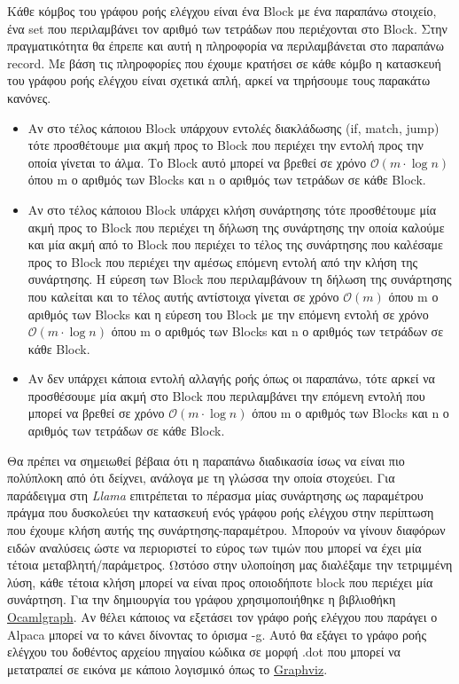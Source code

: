 \documentclass[12pt]{article}
\newcommand{\Llama}{\textit{Llama }}
\begin{document}
Κάθε κόμβος του γράφου ροής ελέγχου είναι ένα Block με ένα παραπάνω στοιχείο, ένα set που περιλαμβάνει τον αριθμό των τετράδων που περιέχονται στο Block. Στην πραγματικότητα θα έπρεπε και αυτή η πληροφορία να περιλαμβάνεται στο παραπάνω record. Με βάση τις πληροφορίες που έχουμε κρατήσει σε κάθε κόμβο η κατασκευή του γράφου ροής ελέγχου είναι σχετικά απλή, αρκεί να τηρήσουμε τους παρακάτω κανόνες.
\begin{itemize}
\item Αν στο τέλος κάποιου Block υπάρχουν εντολές διακλάδωσης (if, match, jump) τότε προσθέτουμε μια ακμή προς το Block που περιέχει την εντολή προς την οποία γίνεται το άλμα. Το Block αυτό μπορεί να βρεθεί σε χρόνο $\mathcal{O}(m \cdot \log n)$ όπου m ο αριθμός των Blocks και n ο αριθμός των τετράδων σε κάθε Block.
\item Αν στο τέλος κάποιου Block υπάρχει κλήση συνάρτησης τότε προσθέτουμε μία ακμή προς το Block που περιέχει τη δήλωση της συνάρτησης την οποία καλούμε και μία ακμή από το Block που περιέχει το τέλος της συνάρτησης που καλέσαμε προς το Block που περιέχει την αμέσως επόμενη εντολή από την κλήση της συνάρτησης. Η εύρεση των Block που περιλαμβάνουν τη δήλωση της συνάρτησης που καλείται και το τέλος αυτής αντίστοιχα γίνεται σε χρόνο $\mathcal{O}(m)$ όπου m ο αριθμός των Blocks και η εύρεση του Block με την επόμενη εντολή σε χρόνο $\mathcal{O}(m \cdot \log n)$ όπου m ο αριθμός των Blocks και n ο αριθμός των τετράδων σε κάθε Block.
\item Αν δεν υπάρχει κάποια εντολή αλλαγής ροής όπως οι παραπάνω, τότε αρκεί να προσθέσουμε μία ακμή στο Block που περιλαμβάνει την επόμενη εντολή που μπορεί να βρεθεί σε χρόνο $\mathcal{O}(m \cdot \log n)$ όπου m ο αριθμός των Blocks και n ο αριθμός των τετράδων σε κάθε Block.
\end{itemize}
Θα πρέπει να σημειωθεί βέβαια ότι η παραπάνω διαδικασία ίσως να είναι πιο πολύπλοκη από ότι δείχνει, ανάλογα με τη γλώσσα την οποία στοχεύει. Για παράδειγμα στη \Llama επιτρέπεται το πέρασμα μίας συνάρτησης ως παραμέτρου πράγμα που δυσκολεύει την κατασκευή ενός γράφου ροής ελέγχου στην περίπτωση που έχουμε κλήση αυτής της συνάρτησης-παραμέτρου. Μπορούν να γίνουν διαφόρων ειδών αναλύσεις ώστε να περιοριστεί το εύρος των τιμών που μπορεί να έχει μία τέτοια μεταβλητή/παράμετρος. Ωστόσο στην υλοποίηση μας διαλέξαμε την τετριμμένη λύση, κάθε τέτοια κλήση μπορεί να είναι προς οποιοδήποτε block που περιέχει μία συνάρτηση. 
Για την δημιουργία του γράφου χρησιμοποιήθηκε η βιβλιοθήκη \href{http://ocamlgraph.lri.fr}{Ocamlgraph}. Αν θέλει κάποιος να εξετάσει τον γράφο ροής ελέγχου που παράγει ο Alpaca μπορεί να το κάνει δίνοντας το όρισμα -g. Αυτό θα εξάγει το γράφο ροής ελέγχου του δοθέντος αρχείου πηγαίου κώδικα σε μορφή .dot που μπορεί να μετατραπεί σε εικόνα με κάποιο λογισμικό όπως το \href{http://graphviz.org}{Graphviz}. 
\end{document}
